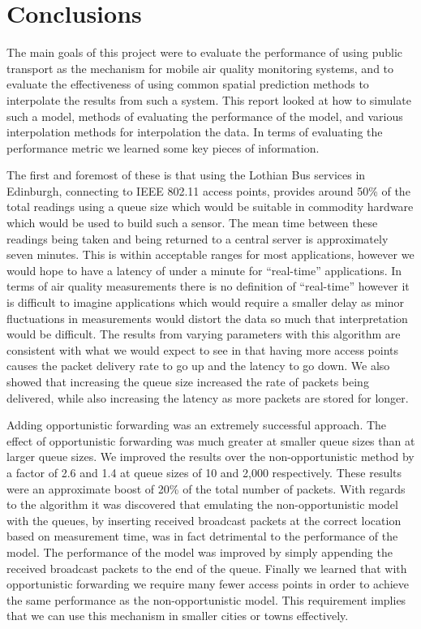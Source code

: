 \chapter{Conclusions}\label{conclusions}


The main goals of this project were to evaluate the performance of using public transport as the mechanism for mobile air quality monitoring systems, and to evaluate the effectiveness of using common spatial prediction methods to interpolate the results from such a system. This report looked at how to simulate such a model, methods of evaluating the performance of the model, and various interpolation methods for interpolation the data. In terms of evaluating the performance metric we learned some key pieces of information. 

The first and foremost of these is that using the Lothian Bus services in Edinburgh, connecting to IEEE 802.11 access points, provides around 50\% of the total readings using a queue size which would be suitable in commodity hardware which would be used to build such a sensor. The mean time between these readings being taken and being returned to a central server is approximately seven minutes. This is within acceptable ranges for most applications, however we would hope to have a latency of under a minute for ``real-time'' applications. In terms of air quality measurements there is no definition of ``real-time'' however it is difficult to imagine applications which would require a smaller delay as minor fluctuations in measurements would distort the data so much that interpretation would be difficult. The results from varying parameters with this algorithm are consistent with what we would expect to see in that having more access points causes the packet delivery rate to go up and the latency to go down. We also showed that increasing the queue size increased the rate of packets being delivered, while also increasing the latency as more packets are stored for longer. 

Adding opportunistic forwarding was an extremely successful approach. The effect of opportunistic forwarding was much greater at smaller queue sizes than at larger queue sizes. We improved the results over the non-opportunistic method by a factor of 2.6 and 1.4 at queue sizes of 10 and 2,000 respectively. These results were an approximate boost of 20\% of the total number of packets. With regards to the algorithm it was discovered that emulating the non-opportunistic model with the queues, by inserting received broadcast packets at the correct location based on measurement time, was in fact detrimental to the performance of the model. The performance of the model was improved by simply appending the received broadcast packets to the end of the queue. Finally we learned that with opportunistic forwarding we require many fewer access points in order to achieve the same performance as the non-opportunistic model. This requirement implies that we can use this mechanism in smaller cities or towns effectively. 

